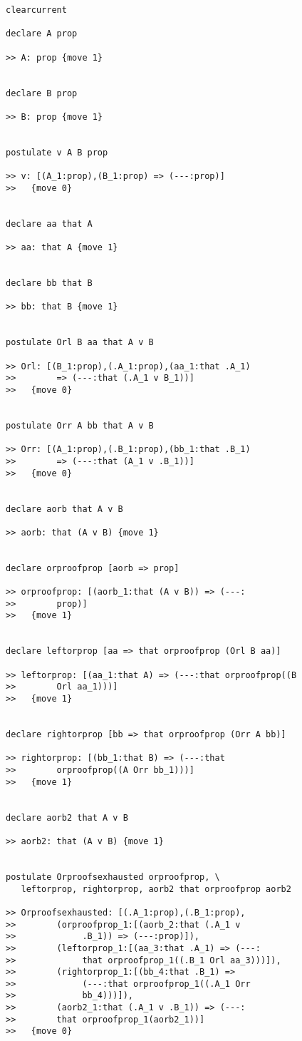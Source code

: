 \documentclass[12pt]{article}
\begin{document}
\begin{verbatim}
clearcurrent

declare A prop

>> A: prop {move 1}


declare B prop

>> B: prop {move 1}


postulate v A B prop

>> v: [(A_1:prop),(B_1:prop) => (---:prop)]
>>   {move 0}


declare aa that A

>> aa: that A {move 1}


declare bb that B

>> bb: that B {move 1}


postulate Orl B aa that A v B

>> Orl: [(B_1:prop),(.A_1:prop),(aa_1:that .A_1) 
>>        => (---:that (.A_1 v B_1))]
>>   {move 0}


postulate Orr A bb that A v B

>> Orr: [(A_1:prop),(.B_1:prop),(bb_1:that .B_1) 
>>        => (---:that (A_1 v .B_1))]
>>   {move 0}


declare aorb that A v B

>> aorb: that (A v B) {move 1}


declare orproofprop [aorb => prop]

>> orproofprop: [(aorb_1:that (A v B)) => (---:
>>        prop)]
>>   {move 1}


declare leftorprop [aa => that orproofprop (Orl B aa)]

>> leftorprop: [(aa_1:that A) => (---:that orproofprop((B 
>>        Orl aa_1)))]
>>   {move 1}


declare rightorprop [bb => that orproofprop (Orr A bb)]

>> rightorprop: [(bb_1:that B) => (---:that 
>>        orproofprop((A Orr bb_1)))]
>>   {move 1}


declare aorb2 that A v B

>> aorb2: that (A v B) {move 1}


postulate Orproofsexhausted orproofprop, \
   leftorprop, rightorprop, aorb2 that orproofprop aorb2

>> Orproofsexhausted: [(.A_1:prop),(.B_1:prop),
>>        (orproofprop_1:[(aorb_2:that (.A_1 v 
>>             .B_1)) => (---:prop)]),
>>        (leftorprop_1:[(aa_3:that .A_1) => (---:
>>             that orproofprop_1((.B_1 Orl aa_3)))]),
>>        (rightorprop_1:[(bb_4:that .B_1) => 
>>             (---:that orproofprop_1((.A_1 Orr 
>>             bb_4)))]),
>>        (aorb2_1:that (.A_1 v .B_1)) => (---:
>>        that orproofprop_1(aorb2_1))]
>>   {move 0}



\end{verbatim}
\end{document}
